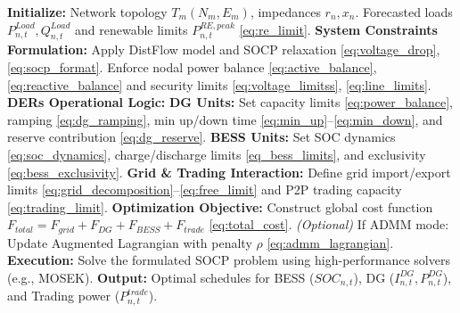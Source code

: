 \documentclass[preprint,12pt]{elsarticle}
\begin{document}
\begin{breakablealgorithm}
    \caption{Day-Ahead SOCP Optimization for Microgrid Energy Management}
    \small
    \begin{algorithmic}[1]
        \State \textbf{Initialize:} 
        \Statex \quad Network topology $T_m(N_m, E_m)$, impedances $r_n, x_n$.
        \Statex \quad Forecasted loads $P^{Load}_{n,t}, Q^{Load}_{n,t}$ and renewable limits $P_{n,t}^{RE,peak}$ \eqref{eq:re_limit}.
        \State \textbf{System Constraints Formulation:}
        \Statex \quad Apply DistFlow model and SOCP relaxation \eqref{eq:voltage_drop}, \eqref{eq:socp_format}.
        \Statex \quad Enforce nodal power balance \eqref{eq:active_balance}, \eqref{eq:reactive_balance} and security limits \eqref{eq:voltage_limitss}, \eqref{eq:line_limits}.
        \State \textbf{DERs Operational Logic:}
        \Statex \quad \textbf{DG Units:} Set capacity limits \eqref{eq:power_balance}, ramping \eqref{eq:dg_ramping}, min up/down time \eqref{eq:min_up}--\eqref{eq:min_down}, and reserve contribution \eqref{eq:dg_reserve}.
        \Statex \quad \textbf{BESS Units:} Set SOC dynamics \eqref{eq:soc_dynamics}, charge/discharge limits \eqref{eq_bess_limits}, and exclusivity \eqref{eq:bess_exclusivity}.
        \State \textbf{Grid \& Trading Interaction:}
        \Statex \quad Define grid import/export limits \eqref{eq:grid_decomposition}--\eqref{eq:free_limit} and P2P trading capacity \eqref{eq:trading_limit}.
        \State \textbf{Optimization Objective:}
        \Statex \quad Construct global cost function $F_{total} = F_{grid} + F_{DG} + F_{BESS} + F_{trade}$ \eqref{eq:total_cost}.
        \Statex \quad \textit{(Optional)} If ADMM mode: Update Augmented Lagrangian with penalty $\rho$ \eqref{eq:admm_lagrangian}.
        \State \textbf{Execution:}
        \Statex \quad Solve the formulated SOCP problem using high-performance solvers (e.g., MOSEK).
        \State \textbf{Output:} 
        \Statex \quad Optimal schedules for BESS ($SOC_{n,t}$), DG ($I^{DG}_{n,t}, P^{DG}_{n,t}$), and Trading power ($P^{trade}_{n,t}$).
    \end{algorithmic}
    \label{SOCP_algorithm}
\end{breakablealgorithm}
\end{document}

